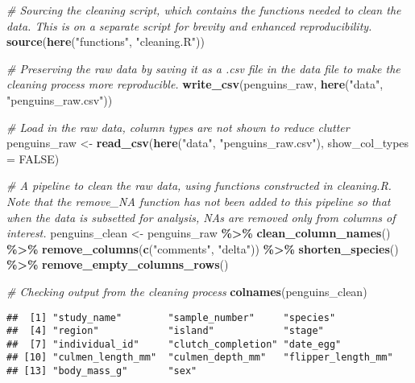 \documentclass[
]{article}
\newenvironment{Shaded}{\begin{snugshade}}{\end{snugshade}}
\newcommand{\AttributeTok}[1]{\textcolor[rgb]{0.13,0.29,0.53}{#1}}
\newcommand{\CommentTok}[1]{\textcolor[rgb]{0.56,0.35,0.01}{\textit{#1}}}
\newcommand{\ConstantTok}[1]{\textcolor[rgb]{0.56,0.35,0.01}{#1}}
\newcommand{\FunctionTok}[1]{\textcolor[rgb]{0.13,0.29,0.53}{\textbf{#1}}}
\newcommand{\NormalTok}[1]{#1}
\newcommand{\OtherTok}[1]{\textcolor[rgb]{0.56,0.35,0.01}{#1}}
\newcommand{\SpecialCharTok}[1]{\textcolor[rgb]{0.81,0.36,0.00}{\textbf{#1}}}
\newcommand{\StringTok}[1]{\textcolor[rgb]{0.31,0.60,0.02}{#1}}
\begin{document}
\begin{Shaded}
\begin{Highlighting}[]
\CommentTok{\# Sourcing the cleaning script, which contains the functions needed to clean the data. This is on a separate script for brevity and enhanced reproducibility.}
\FunctionTok{source}\NormalTok{(}\FunctionTok{here}\NormalTok{(}\StringTok{"functions"}\NormalTok{, }\StringTok{"cleaning.R"}\NormalTok{))}

\CommentTok{\# Preserving the raw data by saving it as a .csv file in the data file to make the cleaning process more reproducible.}
\FunctionTok{write\_csv}\NormalTok{(penguins\_raw, }\FunctionTok{here}\NormalTok{(}\StringTok{"data"}\NormalTok{, }\StringTok{"penguins\_raw.csv"}\NormalTok{))}

\CommentTok{\# Load in the raw data, column types are not shown to reduce clutter}
\NormalTok{penguins\_raw }\OtherTok{\textless{}{-}} \FunctionTok{read\_csv}\NormalTok{(}\FunctionTok{here}\NormalTok{(}\StringTok{"data"}\NormalTok{, }\StringTok{"penguins\_raw.csv"}\NormalTok{), }\AttributeTok{show\_col\_types =} \ConstantTok{FALSE}\NormalTok{)}

\CommentTok{\# A pipeline to clean the raw data, using functions constructed in cleaning.R. Note that the remove\_NA function has not been added to this pipeline so that when the data is subsetted for analysis, NAs are removed only from columns of interest.}
\NormalTok{penguins\_clean }\OtherTok{\textless{}{-}}\NormalTok{ penguins\_raw }\SpecialCharTok{\%\textgreater{}\%}
  \FunctionTok{clean\_column\_names}\NormalTok{() }\SpecialCharTok{\%\textgreater{}\%}
  \FunctionTok{remove\_columns}\NormalTok{(}\FunctionTok{c}\NormalTok{(}\StringTok{"comments"}\NormalTok{, }\StringTok{"delta"}\NormalTok{)) }\SpecialCharTok{\%\textgreater{}\%}
  \FunctionTok{shorten\_species}\NormalTok{() }\SpecialCharTok{\%\textgreater{}\%}
  \FunctionTok{remove\_empty\_columns\_rows}\NormalTok{()}

\CommentTok{\# Checking output from the cleaning process}
\FunctionTok{colnames}\NormalTok{(penguins\_clean)}
\end{Highlighting}
\end{Shaded}

\begin{verbatim}
##  [1] "study_name"        "sample_number"     "species"          
##  [4] "region"            "island"            "stage"            
##  [7] "individual_id"     "clutch_completion" "date_egg"         
## [10] "culmen_length_mm"  "culmen_depth_mm"   "flipper_length_mm"
## [13] "body_mass_g"       "sex"
\end{verbatim}
\end{document}
